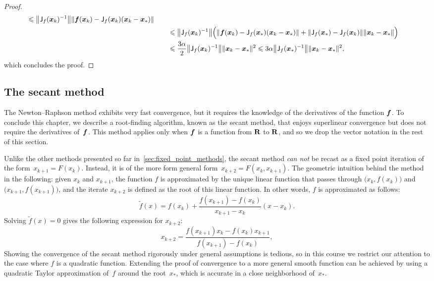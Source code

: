 \begin{proof}
\begin{align*}
         \leq \norm*{\mat J_f(\vect x_k)^{-1}} \norm*{\vect f(\vect x_k) - \mat J_f(\vect x_k) (\vect x_k - \vect x_*) } \\
        &\qquad \leq \norm*{\mat J_f(\vect x_k)^{-1}} \Bigl( \norm{\vect f(\vect x_k) - \mat J_f(\vect x_*) (\vect x_k - \vect x_*) } + \norm{\mat J_f(\vect x_*) - \mat J_f(\vect x_k)} \norm{\vect x_k - \vect x_*} \Bigr) \\
        &\qquad \leq \frac{3 \alpha}{2}\norm*{\mat J_f(\vect x_k)^{-1}} \norm{\vect x_k - \vect x_*}^2
        \leq 3 \alpha \norm*{\mat J_f(\vect x_*)^{-1}} \norm{\vect x_k - \vect x_*}^2,
    \end{align*}
    which concludes the proof.
\end{proof}

\subsection{The secant method~\moreinfo}
The Newton--Raphson method exhibits very fast convergence,
but it requires the knowledge of the derivatives of the function $\mathbf{\boldsymbol{f}}$.
To conclude this chapter,
we describe a root-finding algorithm,
known as the secant method,
that enjoys superlinear convergence but does not require the derivatives of~$\mathbf{\boldsymbol{f}}$.
This method applies only when $\mathbf{\boldsymbol{f}}$ is a function from $\mathbf R$ to $\mathbf R$,
and so we drop the vector notation in the rest of this section.

Unlike the other methods presented so far in~\cref{sec:fixed_point_methods},
the secant method \emph{can not} be recast as a fixed point iteration of the form~$x_{k+1} = F(x_{k})$.
Instead, it is of the more form general form~$x_{k+2} = F(x_k, x_{k+1})$.
The geometric intuition behind the method in the following: given $x_k$ and $x_{k+1}$,
the function $f$ is approximated by the unique linear function that passes through $\bigl(x_k, f(x_k)\bigr)$ and
$\bigl(x_{k+1}, f(x_{k+1})\bigr)$,
and the iterate $x_{k+2}$ is defined as the root of this linear function.
In other words, $f$ is approximated as follows:
\[
    \widetilde f(x) = f(x_k) + \frac{f(x_{k+1}) - f(x_k)}{x_{k+1} - x_k} (x - x_k).
\]
Solving $\widetilde f(x) = 0$ gives the following expression for $x_{k+2}$:
\begin{equation}
    \label{eq:secant_method}
    x_{k+2} = \frac{f(x_{k+1}) x_k - f(x_k) x_{k+1}}{f(x_{k+1}) - f(x_k)},
\end{equation}
Showing the convergence of the secant method rigorously under general assumptions is tedious,
so in this course we restrict our attention to the case where $f$ is a quadratic function.
Extending the proof of convergence to a more general smooth function can be achieved
by using a quadratic Taylor approximation of~$f$ around the root~$x_*$,
which is accurate in a close neighborhood of~$x_*$.

